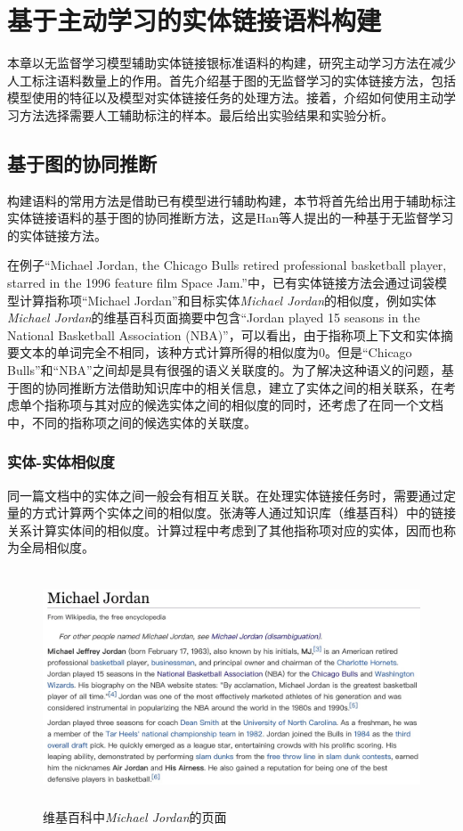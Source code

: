 \chapter{基于主动学习的实体链接语料构建}
本章以无监督学习模型辅助实体链接银标准语料的构建，研究主动学习方法在减少人工标注语料数量上的作用。首先介绍基于图的无监督学习的实体链接方法，包括模型使用的特征以及模型对实体链接任务的处理方法。接着，介绍如何使用主动学习方法选择需要人工辅助标注的样本。最后给出实验结果和实验分析。

\section{基于图的协同推断}
构建语料的常用方法是借助已有模型进行辅助构建，本节将首先给出用于辅助标注实体链接语料的基于图的协同推断方法，这是Han等人\cite{CELWTGBM}提出的一种基于无监督学习的实体链接方法。

在例子“Michael Jordan, the Chicago Bulls retired professional basketball player,  starred in the 1996 feature film Space Jam.”中，已有实体链接方法会通过词袋模型计算指称项“Michael Jordan”和目标实体\textit{Michael Jordan}的相似度，例如实体\textit{Michael Jordan}的维基百科页面摘要中包含“Jordan played 15 seasons in the National Basketball Association (NBA)”，可以看出，由于指称项上下文和实体摘要文本的单词完全不相同，该种方式计算所得的相似度为0。但是“Chicago Bulls”和“NBA”之间却是具有很强的语义关联度的。为了解决这种语义的问题，基于图的协同推断方法借助知识库中的相关信息，建立了实体之间的相关联系，在考虑单个指称项与其对应的候选实体之间的相似度的同时，还考虑了在同一个文档中，不同的指称项之间的候选实体的关联度。

\subsection{实体-实体相似度}\label{section:mm_relation}
同一篇文档中的实体之间一般会有相互关联。在处理实体链接任务时，需要通过定量的方式计算两个实体之间的相似度。张涛等人\cite{张涛2015GraphEL}通过知识库（维基百科）中的链接关系计算实体间的相似度。计算过程中考虑到了其他指称项对应的实体，因而也称为全局相似度。

\begin{figure}[!htb]
	\centering\includegraphics[height=7cm]{resource/jordan_abst}
	\caption{维基百科中\textit{Michael Jordan}的页面}
	\label{fig:jordan_abst}
\end{figure}

